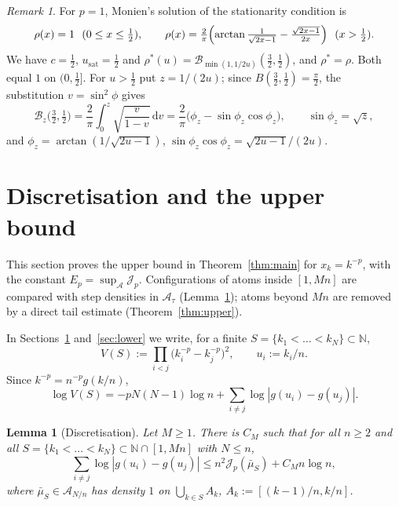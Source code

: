 \documentclass{amsart}
\newtheorem{lemma}[theorem]{Lemma}
\theoremstyle{definition}
\theoremstyle{remark}
\newtheorem{remark}[theorem]{Remark}
\numberwithin{equation}{section}
\newcommand{\N}{\mathbb{N}}
\newcommand{\cA}{\mathcal{A}}
\newcommand{\cJ}{\mathcal{J}}
\newcommand{\cB}{\mathcal{B}}
\newcommand{\dd}{\,\mathrm{d}}
\newcommand{\usat}{u_{\mathrm{sat}}}
\begin{document}
\begin{remark}\label{rem:monien}
For $p=1$, Monien's solution of the stationarity condition \cite[Thm.~3.1]{Monien} is
\[
  \rho(x)=1\ \ (0\le x\le\tfrac12),\qquad
  \rho(x)=\tfrac{2}{\pi}\Bigl(\arctan\tfrac{1}{\sqrt{2x-1}}-\tfrac{\sqrt{2x-1}}{2x}\Bigr)\ \ (x>\tfrac12).
\]
We have $c=\frac12$, $\usat=\frac12$ and $\rho^*(u)=\cB_{\min(1,1/2u)}(\frac32,\frac12)$, and $\rho^*=\rho$. Both
equal $1$ on $(0,\frac12]$. For $u>\frac12$ put
$z=1/(2u)$; since $B(\frac32,\frac12)=\frac\pi2$, the substitution $v=\sin^2\phi$ gives
\[
  \cB_z\bigl(\tfrac32,\tfrac12\bigr)=\frac2\pi\int_0^z\sqrt{\frac{v}{1-v}}\dd v=\frac2\pi\bigl(\phi_z-\sin\phi_z\cos\phi_z\bigr),
  \qquad \sin\phi_z=\sqrt z,
\]
and $\phi_z=\arctan(1/\sqrt{2u-1})$, $\sin\phi_z\cos\phi_z=\sqrt{2u-1}/(2u)$.
\end{remark}

\section{Discretisation and the upper bound}\label{sec:upper}

This section proves the upper bound in Theorem~\ref{thm:main} for $x_k=k^{-p}$, with the constant $E_p=\sup_\cA\cJ_p$.
Configurations of atoms inside $[1,Mn]$ are compared with step densities in $\cA_\tau$ (Lemma~\ref{lem:disc}); atoms
beyond $Mn$ are removed by a direct tail estimate (Theorem~\ref{thm:upper}).

In Sections~\ref{sec:upper} and~\ref{sec:lower} we write, for a finite $S=\{k_1<\dots<k_N\}\subset\N$,
\[
  V(S):=\prod_{i<j}\bigl(k_i^{-p}-k_j^{-p}\bigr)^2,\qquad u_i:=k_i/n .
\]
Since $k^{-p}=n^{-p}g(k/n)$,
\begin{equation}\label{eq:VS}
  \log V(S)=-pN(N-1)\log n+\sum_{i\ne j}\log|g(u_i)-g(u_j)| .
\end{equation}

\begin{lemma}[Discretisation]\label{lem:disc}
Let $M\ge1$. There is $C_M$ such that for all $n\ge2$ and all $S=\{k_1<\dots<k_N\}\subset\N\cap[1,Mn]$ with
$N\le n$,
\[
  \sum_{i\ne j}\log|g(u_i)-g(u_j)|\le n^2\cJ_p(\bar\mu_S)+C_Mn\log n,
\]
where $\bar\mu_S\in\cA_{N/n}$ has density $1$ on $\bigcup_{k\in S}A_k$, $A_k:=[(k-1)/n,k/n]$.
\end{lemma}
\end{document}
